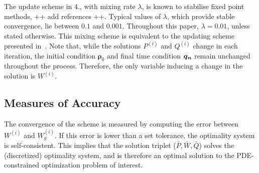 \\
\\
The update scheme in 4., with mixing rate $\lambda$, is known to stabilise fixed point methods, ++ add references ++. Typical values of $\lambda$, which provide stable convergence, lie between $0.1$ and $0.001$. Throughout this paper, $\lambda =0.01$, unless stated otherwise. This mixing scheme is equivalent to the updating scheme presented in~\cite{Burger1}. 
Note that, while the solutions $P^{(i)}$ and $Q^{(i)}$ change in each iteration, the initial condition $\boldsymbol{\rho}_0$ and final time condition $\boldsymbol{q_n}$ remain unchanged throughout the process. Therefore, the only variable inducing a change in the solution is $W^{(i)}$.




\subsection{Measures of Accuracy}\label{sec:Method_Validation}

The convergence of the scheme is measured by computing the error between $W^{(i)}$ and $W^{(i)}_{g}$. If this error is lower than a set tolerance, the optimality system is self-consistent. This implies that the solution triplet ($\bar{P},\bar{W},\bar{Q}$) solves the (discretized) optimality system, and is therefore an optimal solution to the PDE-constrained optimization problem of interest.

